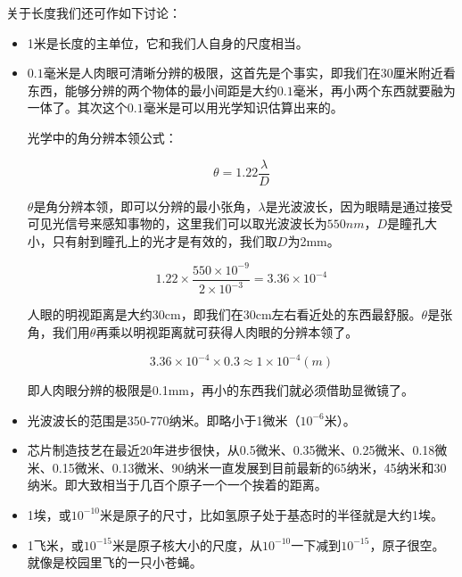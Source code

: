 关于长度我们还可作如下讨论：

\begin{itemize}
\item 1米是长度的主单位，它和我们人自身的尺度相当。

\item $0.1$毫米是人肉眼可清晰分辨的极限，这首先是个事实，即我们在30厘米附近看东西，能够分辨的两个物体的最小间距是大约$0.1$毫米，再小两个东西就要融为一体了。其次这个$0.1$毫米是可以用光学知识估算出来的。

光学中的角分辨本领公式：

\begin{equation}
\theta = 1.22 \frac{\lambda}{D}
\end{equation}

$\theta$是角分辨本领，即可以分辨的最小张角，$\lambda$是光波波长，因为眼睛是通过接受可见光信号来感知事物的，这里我们可以取光波波长为$550 nm$，$D$是瞳孔大小，只有射到瞳孔上的光才是有效的，我们取$D$为2mm。

\begin{equation*}
1.22 \times \frac{550 \times 10^{-9} }{2 \times 10^{-3}} = 3.36 \times 10^{-4}
\end{equation*}

人眼的明视距离是大约30cm，即我们在30cm左右看近处的东西最舒服。$\theta$是张角，我们用$\theta$再乘以明视距离就可获得人肉眼的分辨本领了。

\begin{equation*}
3.36 \times 10^{-4} \times 0.3 \approx 1 \times 10^{-4} (m)
\end{equation*}

即人肉眼分辨的极限是0.1mm，再小的东西我们就必须借助显微镜了。

\item 光波波长的范围是350-770纳米。即略小于1微米（$10^{-6}$米）。

\item 芯片制造技艺在最近20年进步很快，从0.5微米、0.35微米、0.25微米、0.18微米、0.15微米、0.13微米、90纳米一直发展到目前最新的65纳米，45纳米和30纳米。即大致相当于几百个原子一个一个挨着的距离。

\item 1埃，或$10^{-10}$米是原子的尺寸，比如氢原子处于基态时的半径就是大约1埃。

\item 1飞米，或$10^{-15}$米是原子核大小的尺度，从$10^{-10}$一下减到$10^{-15}$，原子很空。就像是校园里飞的一只小苍蝇。

\end{itemize}

